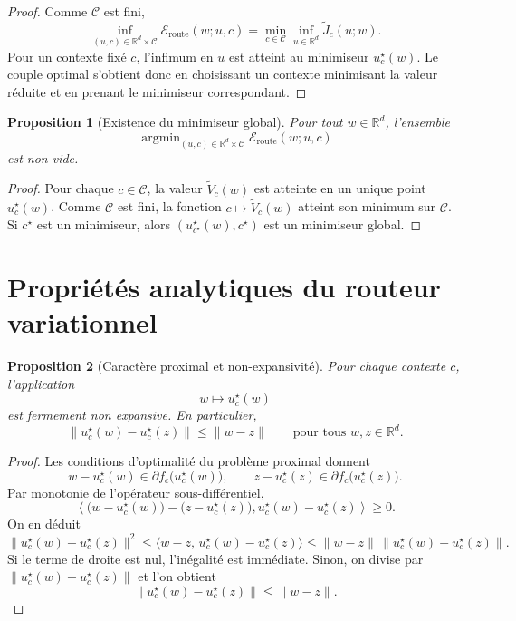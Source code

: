 \documentclass[11pt,a4paper]{article}
\newtheorem{proposition}{Proposition}[section]
\DeclareMathOperator{\argmin}{argmin}
\newcommand{\R}{\mathbb R}
\newcommand{\Ccal}{\mathcal C}
\begin{document}
\begin{proof}
Comme \(\Ccal\) est fini,
\[
\inf_{(u,c)\in \R^d\times\Ccal}\mathcal E_{\mathrm{route}}(w;u,c)
=
\min_{c\in\Ccal}\inf_{u\in\R^d}\widetilde J_c(u;w).
\]
Pour un contexte fixé \(c\), l'infimum en \(u\) est atteint au minimiseur \(u_c^\star(w)\). Le couple optimal s'obtient donc en choisissant un contexte minimisant la valeur réduite et en prenant le minimiseur correspondant.
\end{proof}

\begin{proposition}[Existence du minimiseur global]
Pour tout \(w\in\R^d\), l'ensemble
\[
\argmin_{(u,c)\in \R^d\times\Ccal}\mathcal E_{\mathrm{route}}(w;u,c)
\]
est non vide.
\end{proposition}

\begin{proof}
Pour chaque \(c\in\Ccal\), la valeur \(\widetilde V_c(w)\) est atteinte en un unique point \(u_c^\star(w)\). Comme \(\Ccal\) est fini, la fonction \(c\mapsto \widetilde V_c(w)\) atteint son minimum sur \(\Ccal\). Si \(c^\star\) est un minimiseur, alors \((u_{c^\star}^\star(w),c^\star)\) est un minimiseur global.
\end{proof}

\section{Propriétés analytiques du routeur variationnel}

\begin{proposition}[Caractère proximal et non-expansivité]
Pour chaque contexte \(c\), l'application
\[
w\longmapsto u_c^\star(w)
\]
est fermement non expansive. En particulier,
\[
\|u_c^\star(w)-u_c^\star(z)\|\le \|w-z\|
\qquad
\text{pour tous } w,z\in\R^d.
\]
\end{proposition}

\begin{proof}
Les conditions d'optimalité du problème proximal donnent
\[
w-u_c^\star(w)\in \partial f_c\bigl(u_c^\star(w)\bigr),
\qquad
z-u_c^\star(z)\in \partial f_c\bigl(u_c^\star(z)\bigr).
\]
Par monotonie de l'opérateur sous-différentiel,
\[
\left\langle
\bigl(w-u_c^\star(w)\bigr)-\bigl(z-u_c^\star(z)\bigr),
u_c^\star(w)-u_c^\star(z)
\right\rangle\ge 0.
\]
On en déduit
\[
\|u_c^\star(w)-u_c^\star(z)\|^2
\le
\langle w-z,\,u_c^\star(w)-u_c^\star(z)\rangle
\le
\|w-z\|\,\|u_c^\star(w)-u_c^\star(z)\|.
\]
Si le terme de droite est nul, l'inégalité est immédiate. Sinon, on divise par \(\|u_c^\star(w)-u_c^\star(z)\|\) et l'on obtient
\[
\|u_c^\star(w)-u_c^\star(z)\|\le \|w-z\|.
\]
\end{proof}
\end{document}
